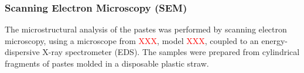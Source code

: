 \subsubsection{Scanning Electron Microscopy (SEM)}
\label{subsubsec:sem}

The microstructural analysis of the pastes was performed by scanning electron microscopy, using a microscope from \textcolor{red}{XXX}, model \textcolor{red}{XXX}, coupled to an energy-dispersive X-ray spectrometer (EDS). The samples were prepared from cylindrical fragments of pastes molded in a disposable plastic straw.

